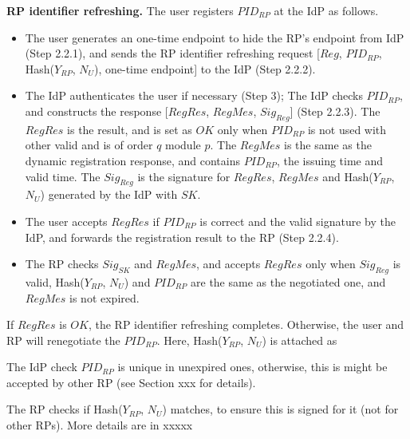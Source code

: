 \vspace{1mm}\noindent\textbf{RP identifier refreshing.}
The user registers $PID_{RP}$ at the IdP as follows.
\begin{itemize}
  \item The user generates an one-time endpoint to hide the RP's endpoint from IdP (Step 2.2.1), and sends the RP identifier refreshing request [$Reg$, $PID_{RP}$, Hash($Y_{RP}$, $N_U$), one-time endpoint] to the IdP (Step 2.2.2).
  \item The IdP authenticates the user if necessary (Step 3); The IdP checks $PID_{RP}$, and constructs the response [$RegRes$, $RegMes$, $Sig_{Reg}$] (Step 2.2.3). The $RegRes$ is the result, and is set as $OK$ only when $PID_{RP}$ is not used with other valid and is of order $q$ module $p$. The $RegMes$ is the same as the dynamic registration response, and contains $PID_{RP}$, the issuing time and valid time. The $Sig_{Reg}$ is the signature for $RegRes$, $RegMes$ and Hash($Y_{RP}$, $N_U$) generated by the IdP with $SK$.
  \item The user accepts $RegRes$ if $PID_{RP}$ is correct and the valid signature by the IdP,
    and forwards the registration result to the RP (Step 2.2.4).
  \item The RP checks $Sig_{SK}$ and $RegMes$, and accepts $RegRes$ only when $Sig_{Reg}$ is valid, Hash($Y_{RP}$, $N_U$) and $PID_{RP}$ are the same as the negotiated one, and $RegMes$ is not expired.
\end{itemize}
If $RegRes$ is $OK$, the RP identifier refreshing completes. Otherwise, the user and RP will renegotiate the $PID_{RP}$.
Here, Hash($Y_{RP}$, $N_U$) is attached as 

The IdP check $PID_{RP}$ is unique in unexpired ones,
 otherwise, this is might be accepted by other RP (see Section xxx for details).

The RP checks if Hash($Y_{RP}$, $N_U$) matches,
    to ensure this is signed for it (not for other RPs).
More details are in xxxxx

